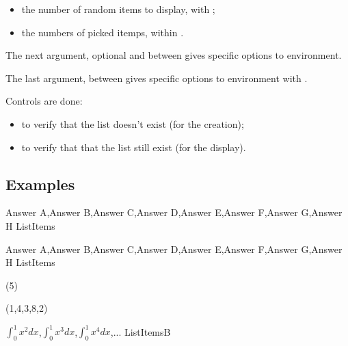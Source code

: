 \documentclass[english,11pt,a4paper]{article}
\begin{document}
\begin{itemize}
	\item the number of random items to display, with ;
	\item the numbers of picked itemps, within .
\end{itemize}

The next argument, optional and between  gives specific options to  environment.

The last argument, between  gives specific options to  environment with .

\medskip

Controls are done:

\begin{itemize}
	\item to verify that the list doesn't exist (for the creation);
	\item to verify that that the list still exist (for the display).
\end{itemize}

\subsection{Examples}

\begin{codehigh}[language=latex/latex3,style/main=teal!25,style/code=teal!25]
\CreateItemsList%
    {Answer A,Answer B,Answer C,Answer D,Answer E,Answer F,Answer G,Answer H}%
    {\mylistofitems}{ListItems}
\end{codehigh}

\CreateItemsList%
{Answer A,Answer B,Answer C,Answer D,Answer E,Answer F,Answer G,Answer H}%
{\mylistofitems}{ListItems}

\begin{demohigh}[language=latex/latex3,style/main=teal!25,style/code=teal!25]
(5)
\end{demohigh}

\begin{demohigh}[language=latex/latex3,style/main=teal!25,style/code=teal!25]
(1,4,3,8,2)
\end{demohigh}

\begin{codehigh}[language=latex/latex3,style/main=teal!25,style/code=teal!25]
\CreateItemsList%
    {{$\int_0^1 x^2 dx$},{$\int_0^1 x^3 dx$},{$\int_0^1 x^4 dx$},...}%
    {\mylistofitemsb}{ListItemsB}
\end{codehigh}
\end{document}
